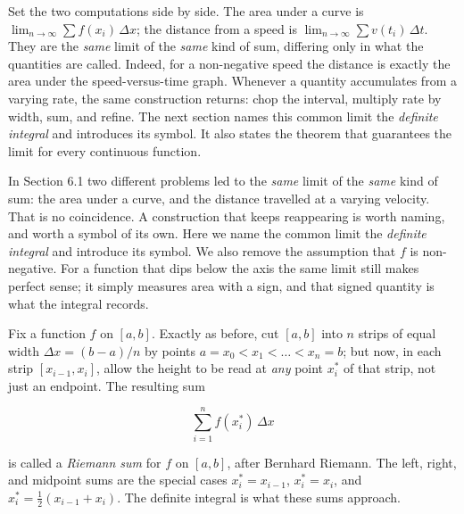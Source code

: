 \documentclass[a4paper,12pt,oneside]{memoir}
\begin{document}
Set the two computations side by side. The area under a curve is \(\lim_{n\to\infty}\sum f(x_{i})\,\Delta x\); the distance from a speed is \(\lim_{n\to\infty}\sum v(t_{i})\,\Delta t\). They are the \emph{same} limit of the \emph{same} kind of sum, differing only in what the quantities are called. Indeed, for a non-negative speed the distance is exactly the area under the speed-versus-time graph. Whenever a quantity accumulates from a varying rate, the same construction returns: chop the interval, multiply rate by width, sum, and refine. The next section names this common limit the \emph{definite integral} and introduces its symbol. It also states the theorem that guarantees the limit for every continuous function.


In Section 6.1 two different problems led to the \emph{same} limit of the \emph{same} kind of sum: the area under a curve, and the distance travelled at a varying velocity. That is no coincidence. A construction that keeps reappearing is worth naming, and worth a symbol of its own. Here we name the common limit the \emph{definite integral} and introduce its symbol. We also remove the assumption that \(f\) is non-negative. For a function that dips below the axis the same limit still makes perfect sense; it simply measures area with a sign, and that signed quantity is what the integral records.

Fix a function \(f\) on \([a, b]\). Exactly as before, cut \([a, b]\) into \(n\) strips of equal width \(\Delta x = (b - a)/n\) by points \(a = x_{0} < x_{1} < \dots < x_{n} = b\); but now, in each strip \([x_{i-1}, x_{i}]\), allow the height to be read at \emph{any} point \(x_{i}^{*}\) of that strip, not just an endpoint. The resulting sum

\[ \sum_{i=1}^{n} f(x_{i}^{*})\,\Delta x \]

is called a \emph{Riemann sum} for \(f\) on \([a, b]\), after Bernhard Riemann. The left, right, and midpoint sums are the special cases \(x_{i}^{*} = x_{i-1}\), \(x_{i}^{*} = x_{i}\), and \(x_{i}^{*} = \tfrac{1}{2}(x_{i-1} + x_{i})\). The definite integral is what these sums approach.
\end{document}
